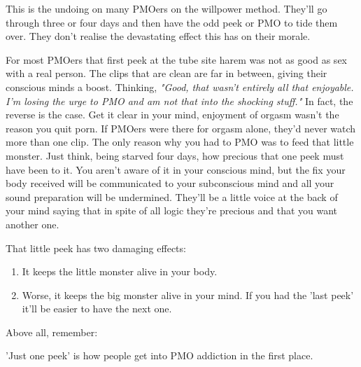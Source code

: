 \documentclass[easypeasy.tex]{subfiles}
\begin{document}
This is the undoing on many PMOers on the willpower method. They'll go through three or four days and then have the odd peek or PMO to tide them over. They don't realise the devastating effect this has on their morale. 

For most PMOers that first peek at the tube site harem was not as good as sex with a real person. The clips that are clean are far in between, giving their conscious minds a boost. Thinking, \textit{"Good, that wasn't entirely all that enjoyable. I'm losing the urge to PMO and am not that into the shocking stuff."} In fact, the reverse is the case. Get it clear in your mind, enjoyment of orgasm wasn't the reason you quit porn. If PMOers were there for orgasm alone, they'd never watch more than one clip. The only reason why you had to PMO was to feed that little monster. Just think, being starved four days, how precious that one peek must have been to it. You aren't aware of it in your conscious mind, but the fix your body received will be communicated to your subconscious mind and all your sound preparation will be undermined. They'll be a little voice at the back of your mind saying that in spite of all logic they're precious and that you want another one.

That little peek has two damaging effects:
\begin{enumerate}
  \item It keeps the little monster alive in your body.
  \item Worse, it keeps the big monster alive in your mind. If you had the 'last peek' it'll be easier to have the next one.
\end{enumerate}

Above all, remember:

  {\huge 'Just one peek' is how people get into PMO addiction in the first place.}
\end{document}
